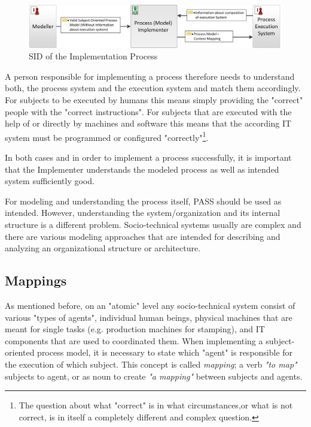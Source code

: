 \begin{figure}[htbp]
	\centering
	\includegraphics[width=0.9\linewidth]{Figures/Implementation/ProcessImplementationSID.png}
	\caption[SID of the Process Model Implementation Process]{SID of the Implementation Process}
	\label{fig:ImplementationProcessSID}
\end{figure}

A person responsible for implementing a process therefore needs to understand both, the process system and the execution system and match them accordingly. For subjects to be executed by humans this means simply providing the "correct" people with the "correct instructions". For subjects that are executed with the help of or directly by machines and software this means that the according IT system must be programmed or configured "correctly"\footnote{The question about what "correct" is in what circumstances,or what  is not correct, is in itself a completely different and complex question.}. 

In both cases and in order to implement a process successfully, it is important that the Implementer understands the modeled process as well as intended system sufficiently good.  

For modeling and understanding the process itself, PASS should be used as intended. However, understanding the system/organization and its internal structure is a different problem. Socio-technical systems usually are complex and there are various modeling approaches that are intended for describing and analyzing an organizational structure or architecture.

\subsection{Mappings}

As mentioned before, on an "atomic" level any socio-technical system consist of various "types of agents", individual human beings, physical machines that are meant for single tasks (e.g. production machines for stamping), and IT components that are used to coordinated them. When implementing a subject-oriented process model, it is necessary to state which "agent" is responsible for the execution of which subject. This concept is called \textit{mapping}; a verb \textit{"to map"} subjects to agent, or as noun to create \textit{"a mapping"} between subjects and agents.



